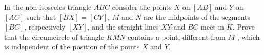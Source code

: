 In the non-isosceles triangle $ABC$ consider the points $X$ on $[AB]$ and $Y$ on $[AC]$ such that $[BX]=[CY]$, $M$ and $N$ are the midpoints of the segments $[BC]$, respectively $[XY]$, and the straight lines $XY$ and $BC$ meet in $K$. Prove that the circumcircle of triangle $KMN$ contains a point, different from $M$ , which is independent of the position of the points $X$ and $Y$.